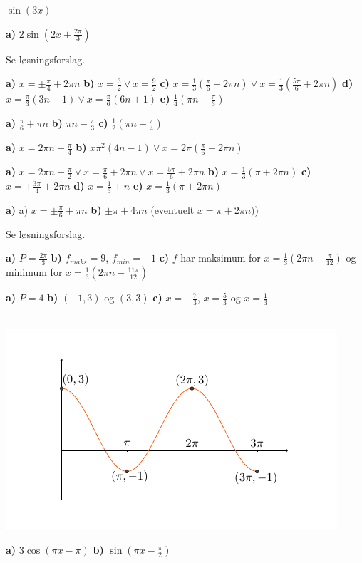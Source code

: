  $ \sin(3x) $

 \textbf{a)} $2\sin\left(2x+\frac{2\pi}{3}\right)  $ 

 Se løsningsforslag.

 \textbf{a)} $ x = \pm \frac{\pi}{4}+2\pi n $ \textbf{b)} $ x=\frac{3}{2} \vee x = \frac{9}{2} $ \textbf{c)} $ x=\frac{1}{3}(\frac{\pi}{6}+2\pi n)\vee x= \frac{1}{3}(\frac{5\pi}{6}+2\pi n) $ \textbf{d)} $ x=\frac{\pi}{3}(3n+1)\vee x= \frac{\pi}{6}(6 n+1)$ \textbf{e)} $\frac{1}{4}(\pi n-\frac{\pi}{3} )$

 \textbf{a)} $ \frac{\pi}{6}+\pi n $ \textbf{b)} $ \pi n-\frac{\pi}{3} $ \textbf{c)} $ \frac{1}{2}\left(\pi n-\frac{\pi}{4}\right) $

\textbf{a)} $ x=2\pi n-\frac{\pi}{4} $
\textbf{b)} $ x\pi^2(4n-1)\vee x=2\pi\left(\frac{\pi}{6}+2\pi n\right) $ 

\textbf{a)} ${ x= 2\pi n-\frac{\pi}{2} \vee x = \frac{\pi}{6}+2\pi n \vee x = \frac{5\pi}{6}+2\pi n}$ \textbf{b)} ${ x=\frac{1}{3}(\pi +2\pi n) }$ \textbf{c)} ${ x = \pm \frac{3\pi}{4}+2\pi n  }$ \textbf{d)} ${ x=\frac{1}{3}+n }$ \textbf{e)} ${ x=\frac{1}{3}(\pi +2\pi n) }$

\textbf{a)} a) $ x = \pm \frac{\pi}{6}+\pi n $ \textbf{b)} $ \pm \pi + 4\pi n$ (eventuelt $ x=\pi +2\pi n) $)

 Se løsningsforslag.

 \textbf{a)} $ P = \frac{2\pi}{3} $ \textbf{b)} $ f_{maks}=9 $, $ f_{min}=-1 $ \textbf{c)} $ f $ har maksimum for $ x= \frac{1}{3}\left(2\pi n-\frac{\pi}{12}\right) $ og minimum for $ x=\frac{1}{3}(2\pi n-\frac{11\pi}{12}) $

 \textbf{a)} $ P=4 $ \textbf{b)} $ (-1, 3) $ og $ (3, 3) $ \textbf{c)}  $ x=-\frac{7}{3} $, $ x=\frac{5}{3} $ og $ x=\frac{1}{3} $

\\
\vds
\includegraphics[]{skissin}\vs

\textbf{a)} $ 3\cos(\pi x - \pi) $ \textbf{b)} $ \sin\left(\pi x-\frac{\pi}{2}\right) $




